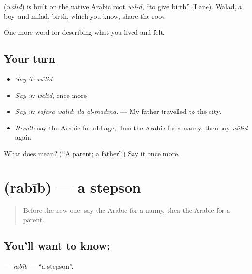 \begin{cousinweb}
\textbf{} (\emph{wālid}) is built on the native Arabic root \emph{w-l-d}, \textquotedblleft{}to give birth\textquotedblright{} (Lane). Walad, a boy, and mīlād, birth, which you know, share the root.
\end{cousinweb}

\begin{grammarlens}[title={What you've built}]
One more word for describing what you lived and felt.
\end{grammarlens}

\subsection*{Your turn}
\begin{itemize}
\raggedright
  \item \emph{Say it:} \emph{wālid}
  \item \emph{Say it:} \emph{wālid}, once more
  \item \emph{Say it:} \emph{sāfara wālidī ilā al-madīna.} — My father travelled to the city.
  \item \emph{Recall:} say the Arabic for old age, then the Arabic for a nanny, then say \emph{wālid} again
\end{itemize}

\begin{tcolorbox}[breakable,colback=teal!4,colframe=teal!35!black,title={Before you move on}]
What does  mean? (\textquotedblleft{}A parent; a father\textquotedblright{}.) Say it once more.
\end{tcolorbox}
\section[\texorpdfstring{\ar{ربيب} (rabīb)}{ربيب (rabīb)}]{ (rabīb) — a stepson}

\label{lesson:AR-C532-rabib}



\begin{quote}
Before the new one: say the Arabic for a nanny, then the Arabic for a parent.
\end{quote}

\subsection*{You'll want to know: }
\textbf{} — \emph{rabīb} — \textquotedblleft{}a stepson\textquotedblright{}.

